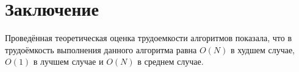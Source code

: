 \chapter*{Заключение}

Проведённая теоретическая оценка трудоемкости алгоритмов показала, что в трудоёмкость выполнения данного алгоритма равна $O(N)$ в худшем случае, $O(1)$ в лучшем случае и $O(N)$ в среднем случае.